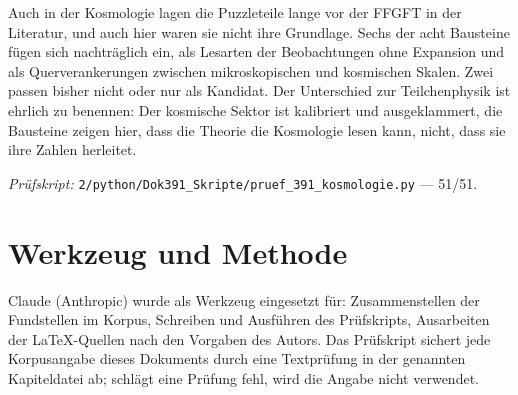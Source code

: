Auch in der Kosmologie lagen die Puzzleteile lange vor der FFGFT in der Literatur, und auch hier
waren sie nicht ihre Grundlage. Sechs der acht Bausteine fügen sich nachträglich ein, als Lesarten
der Beobachtungen ohne Expansion und als Querverankerungen zwischen mikroskopischen und kosmischen
Skalen. Zwei passen bisher nicht oder nur als Kandidat. Der Unterschied zur Teilchenphysik ist ehrlich zu benennen: Der
kosmische Sektor ist kalibriert und ausgeklammert, die Bausteine zeigen hier, dass die Theorie
die Kosmologie lesen kann, nicht, dass sie ihre Zahlen herleitet.

\vspace{1em}
\noindent\textit{Prüfskript:} \texttt{2/python/Dok391\_Skripte/pruef\_391\_kosmologie.py}
--- 51/51.

\section*{Werkzeug und Methode}

Claude (Anthropic) wurde als Werkzeug eingesetzt für: Zusammenstellen der Fundstellen im Korpus,
Schreiben und Ausführen des Prüfskripts, Ausarbeiten der \LaTeX-Quellen nach den Vorgaben des
Autors. Das Prüfskript sichert jede Korpusangabe dieses Dokuments durch eine Textprüfung in der
genannten Kapiteldatei ab; schlägt eine Prüfung fehl, wird die Angabe nicht verwendet.

